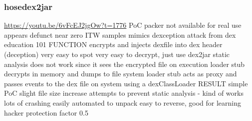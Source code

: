 \subsubsection{hosedex2jar}
\url{https://youtu.be/6vFcEJ2jgOw?t=1776}\newline
PoC packer\newline
not available for real use\newline
appears defunct\newline
near zero ITW samples\newline
mimics dexception attack from dex education 101\newline
FUNCTION\newline
encrypts and injects dexfile into dex header (deception)\newline
very easy to spot\newline
very easy to decrypt, just use dex2jar\newline
static analysis does not work since it sees the encrypted file\newline
on execution loader stub decrypts in memory and dumps to file system\newline
loader stub acts as proxy and passes events to the dex file on system using a dexClassLoader\newline
RESULT\newline
simple PoC\newline
slight file size increase\newline
attempts to prevent static analysis - kind of works\newline
lots of crashing\newline
easily automated to unpack\newline
easy to reverse, good for learning\newline
hacker protection factor 0.5
